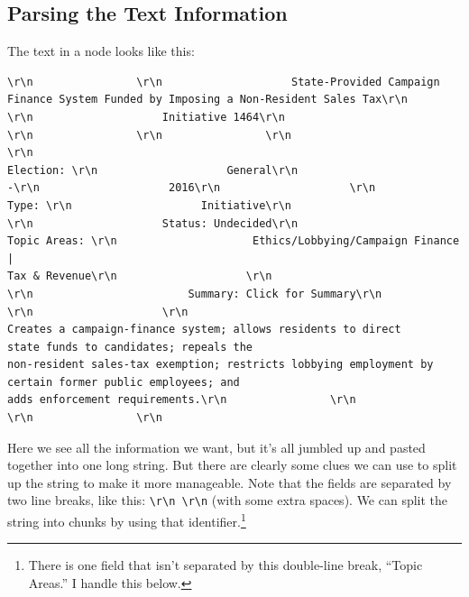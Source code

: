 \documentclass{article}\usepackage[]{graphicx}\usepackage[]{color}
\begin{document}
\subsection{Parsing the Text Information}

The text in a node looks like this: 
\begin{Verbatim}[frame=single]
\r\n                \r\n                    State-Provided Campaign 
Finance System Funded by Imposing a Non-Resident Sales Tax\r\n            
\r\n                    Initiative 1464\r\n                
\r\n                \r\n                \r\n                
\r\n        
Election: \r\n                    General\r\n                    
-\r\n                    2016\r\n                    \r\n         
Type: \r\n                    Initiative\r\n               
\r\n                    Status: Undecided\r\n                  
Topic Areas: \r\n                     Ethics/Lobbying/Campaign Finance | 
Tax & Revenue\r\n                    \r\n        
\r\n                        Summary: Click for Summary\r\n            
\r\n                    \r\n        
Creates a campaign-finance system; allows residents to direct 
state funds to candidates; repeals the
non-resident sales-tax exemption; restricts lobbying employment by 
certain former public employees; and 
adds enforcement requirements.\r\n                \r\n              
\r\n                \r\n            
\end{Verbatim}

Here we see all the information we want, but it's all jumbled up and pasted together into one long string. But there are clearly some clues we can use to split up the string to make it more manageable. Note that the fields are separated by two line breaks, like this: \verb!\r\n \r\n! (with some extra spaces). We can split the string into chunks by using that identifier.\footnote{There is one field that isn't separated by  this double-line break, ``Topic Areas.'' I handle this below.}
\end{document}
